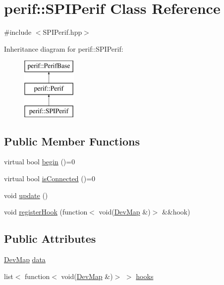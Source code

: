 \hypertarget{classperif_1_1SPIPerif}{}\section{perif\+::S\+P\+I\+Perif Class Reference}
\label{classperif_1_1SPIPerif}


{\ttfamily \#include $<$S\+P\+I\+Perif.\+hpp$>$}

Inheritance diagram for perif\+::S\+P\+I\+Perif\+:\begin{figure}[H]
\begin{center}
\leavevmode
\includegraphics[height=3.000000cm]{classperif_1_1SPIPerif}
\end{center}
\end{figure}
\subsection*{Public Member Functions}
\begin{DoxyCompactItemize}
\item 
virtual bool \mbox{\hyperlink{classperif_1_1Perif_ae7f1d1a4e9cd2343d51abc4ee21000cf}{begin}} ()=0
\item 
virtual bool \mbox{\hyperlink{classperif_1_1Perif_ab9a17fad04e595f3ac0c78b9d3be4c9e}{is\+Connected}} ()=0
\item 
void \mbox{\hyperlink{classperif_1_1Perif_ad6fe1a13354bba4af4cc2751399ed93c}{update}} ()
\item 
void \mbox{\hyperlink{classperif_1_1PerifBase_a2e8bcc221ee253b21b61c7c07307d931}{register\+Hook}} (function$<$ void(\mbox{\hyperlink{Perif_8hpp_a358ff4ee6d24694ee7661f0cce14377e}{Dev\+Map}} \&)$>$ \&\&hook)
\end{DoxyCompactItemize}
\subsection*{Public Attributes}
\begin{DoxyCompactItemize}
\item 
\mbox{\hyperlink{Perif_8hpp_a358ff4ee6d24694ee7661f0cce14377e}{Dev\+Map}} \mbox{\hyperlink{classperif_1_1PerifBase_a1a3afaa535fda17e9f97123fffe78765}{data}}
\item 
list$<$ function$<$ void(\mbox{\hyperlink{Perif_8hpp_a358ff4ee6d24694ee7661f0cce14377e}{Dev\+Map}} \&)$>$ $>$ \mbox{\hyperlink{classperif_1_1PerifBase_a98964e5ca8384df64881265e0aa6d7b6}{hooks}}
\end{DoxyCompactItemize}
